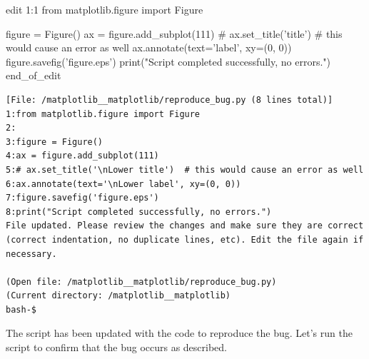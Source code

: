 {\begin{agentbox}
\hrulefill
\begin{CodeVerbatim}[breaklines=true, breakanywhere=true]
edit 1:1
from matplotlib.figure import Figure

figure = Figure()
ax = figure.add_subplot(111)
# ax.set_title('\nLower title')  # this would cause an error as well
ax.annotate(text='\nLower label', xy=(0, 0))
figure.savefig('figure.eps')
print("Script completed successfully, no errors.")
end_of_edit
\end{CodeVerbatim}
\end{agentbox}
\begin{observationbox}\begin{Verbatim}[breaklines=true, breakanywhere=true]
[File: /matplotlib__matplotlib/reproduce_bug.py (8 lines total)]
1:from matplotlib.figure import Figure
2:
3:figure = Figure()
4:ax = figure.add_subplot(111)
5:# ax.set_title('\nLower title')  # this would cause an error as well
6:ax.annotate(text='\nLower label', xy=(0, 0))
7:figure.savefig('figure.eps')
8:print("Script completed successfully, no errors.")
File updated. Please review the changes and make sure they are correct (correct indentation, no duplicate lines, etc). Edit the file again if necessary.

(Open file: /matplotlib__matplotlib/reproduce_bug.py)
(Current directory: /matplotlib__matplotlib)
bash-$
\end{Verbatim}
\end{observationbox}
\begin{agentbox}
The script has been updated with the code to reproduce the bug. Let's run the script to confirm that the bug occurs as described.


\end{agentbox}}
